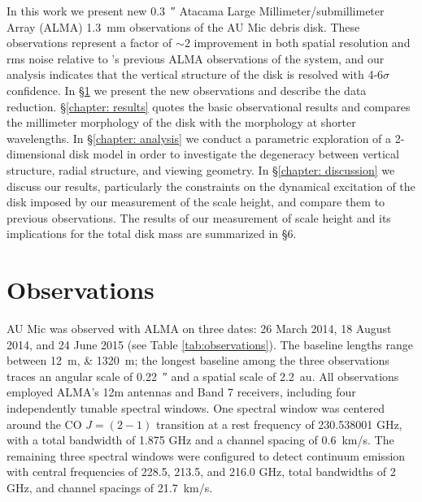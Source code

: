 \documentclass[12pt,oneside]{book}
\begin{document}
In this work we present new \SI{0.3}{\arcsecond} Atacama Large Millimeter/submillimeter Array (ALMA) \SI{1.3}{mm} observations of the AU Mic debris disk. 
These observations represent a factor of $\sim 2$ improvement in both spatial resolution and rms noise relative to \cite{macgregor13}'s previous ALMA observations of the system, and our analysis indicates that the vertical structure of the disk is resolved with 4-6$\sigma$ confidence.
In \S \ref{chapter: observations} we present the new observations and describe the data reduction.  
\S \ref{chapter: results} quotes the basic observational results and compares the millimeter morphology of the disk with the morphology at shorter wavelengths.  
In \S \ref{chapter: analysis} we conduct a parametric exploration of a 2-dimensional disk model in order to investigate the degeneracy between vertical structure, radial structure, and viewing geometry.
In \S \ref{chapter: discussion} we discuss our results, particularly the constraints on the dynamical excitation of the disk imposed by our measurement of the scale height, and compare them to previous observations.
The results of our measurement of scale height and its implications for the total disk mass are summarized in \S 6.

\clearpage

\chapter{Observations}
\label{chapter: observations}
AU Mic was observed  with ALMA on three dates: 26 March 2014, 18 August 2014, and 24 June 2015 (see Table \ref{tab:observations}). 
The baseline lengths range between \SIlist{12;1320}{m}; the longest baseline among the three observations traces an angular scale of \SI{0.22}{\arcsecond} and a spatial scale of \SI{2.2}{au}.
All observations employed ALMA's 12m antennas and Band 7 receivers, including four independently tunable spectral windows. 
One spectral window was centered around the CO $J = (2-1)$ transition at a rest frequency of 230.538001 GHz, with a total bandwidth of 1.875 GHz and a channel spacing of \SI{0.6}{km/s}.
The remaining three spectral windows were configured to detect continuum emission with central frequencies of 228.5, 213.5, and 216.0 GHz, total bandwidths of 2 GHz, and channel spacings of \SI{21.7}{km/s}.
\end{document}
